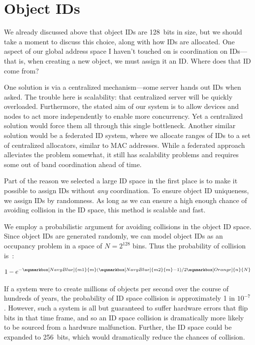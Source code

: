 \section{Object IDs}

We already discussed above that object IDs are 128~bits in size, but we should take a moment to discuss this choice,
along with how IDs are allocated. One aspect of our global address space I haven't touched on is coordination on IDs---that is,
when creating a new object, we must assign it an ID. Where does that ID come from?

One solution is via a centralized mechanism---some server hands out IDs when asked. The trouble here is scalability:
that centralized server will be quickly overloaded. Furthermore, the stated aim of our system is to allow devices and
nodes to act more independently to enable more concurrency. Yet a centralized solution would force them all through this
single bottleneck. Another similar solution would be a federated ID system, where we allocate ranges of IDs to a set of
centralized allocators, similar to MAC addresses. While a federated approach alleviates the problem somewhat, it still
has scalability problems and requires some out of band coordination ahead of time.

Part of the reason we selected a large ID space in the first place is to make it possible to assign IDs without
\emph{any} coordination. To ensure object ID uniqueness, we assign IDs by randomness. As long as we can ensure a high
enough chance of avoiding collision in the ID space, this method is scalable and fast.

We employ a probabilistic argument for avoiding collisions in the
object ID space. Since object IDs are generated randomly, we can model object IDs as an occupancy
problem in a space of $N = 2^{128}$ bins. Thus the probability of collision
is~\cite{motwani95}:

\begin{gather*}
    1 - e^{-
            \eqnmarkbox[NavyBlue]{m1}{m}
            (
            \eqnmarkbox[NavyBlue]{m2}{m}
            -1) / 2
            \eqnmarkbox[Orange]{n}{N}
        }
\end{gather*}

If a system were to create millions of objects per second over the course of hundreds of years, the
probability of ID space collision is approximately 1 in $10^{-7}$. However, such a system is all but
guaranteed to suffer hardware errors that flip bits in that time frame, and so an ID space collision is dramatically more likely to be
sourced from a hardware malfunction. Further, the ID space
could be expanded to 256~bits, which would dramatically reduce the chances of collision.

